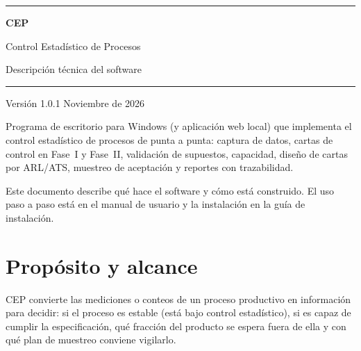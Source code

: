 \documentclass[11pt,a4paper]{article}
\begin{document}
\begin{titlepage}
\vspace*{3cm}
{\color{primario}\rule{\linewidth}{1.2pt}}\par\vspace{1.2em}
{\fontsize{30}{36}\selectfont\bfseries\color{primario} CEP\par}
\vspace{0.4em}
{\LARGE Control Estadístico de Procesos\par}
\vspace{1.5em}
{\Large Descripción técnica del software\par}
\vspace{1.2em}
{\color{primario}\rule{\linewidth}{1.2pt}}\par
\vspace{2em}
{\large Versión 1.0.1 \hfill Noviembre de 2026\par}
\vfill
\begin{minipage}{\linewidth}\color{gristexto}
Programa de escritorio para Windows (y aplicación web local) que implementa el control
estadístico de procesos de punta a punta: captura de datos, cartas de control en Fase~I y
Fase~II, validación de supuestos, capacidad, diseño de cartas por ARL/ATS, muestreo de
aceptación y reportes con trazabilidad.

\medskip
Este documento describe qué hace el software y cómo está construido. El uso paso a paso está
en el manual de usuario y la instalación en la guía de instalación.
\end{minipage}
\end{titlepage}

{\setlength{\parskip}{0pt}\tableofcontents}
\newpage

\section{Propósito y alcance}

CEP convierte las mediciones o conteos de un proceso productivo en información para decidir:
si el proceso es estable (está bajo control estadístico), si es capaz de cumplir la
especificación, qué fracción del producto se espera fuera de ella y con qué plan de muestreo
conviene vigilarlo.
\end{document}
